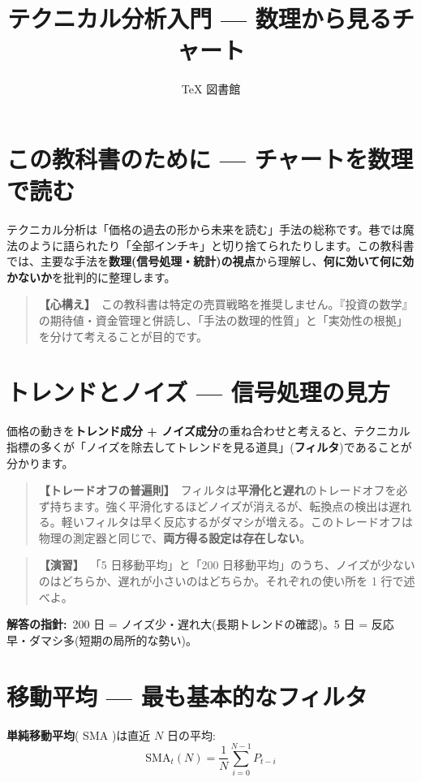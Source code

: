 \documentclass{article}
\title{テクニカル分析入門 — 数理から見るチャート}
\author{TeX 図書館}
\begin{document}
\section{この教科書のために — チャートを数理で読む}

テクニカル分析は「価格の過去の形から未来を読む」手法の総称です。巷では魔法のように語られたり「全部インチキ」と切り捨てられたりします。この教科書では、主要な手法を\textbf{数理(信号処理・統計)の視点}から理解し、\textbf{何に効いて何に効かないか}を批判的に整理します。

\begin{quote}
\textbf{【心構え】}\ この教科書は特定の売買戦略を推奨しません。『投資の数学』の期待値・資金管理と併読し、「手法の数理的性質」と「実効性の根拠」を分けて考えることが目的です。
\end{quote}

\section{トレンドとノイズ — 信号処理の見方}

価格の動きを\textbf{トレンド成分 + ノイズ成分}の重ね合わせと考えると、テクニカル指標の多くが「ノイズを除去してトレンドを見る道具」(\textbf{フィルタ})であることが分かります。

\begin{quote}
\textbf{【トレードオフの普遍則】}\ フィルタは\textbf{平滑化と遅れ}のトレードオフを必ず持ちます。強く平滑化するほどノイズが消えるが、転換点の検出は遅れる。軽いフィルタは早く反応するがダマシが増える。このトレードオフは物理の測定器と同じで、\textbf{両方得る設定は存在しない}。
\end{quote}

\begin{quote}
\textbf{【演習】}\ 「5 日移動平均」と「200 日移動平均」のうち、ノイズが少ないのはどちらか、遅れが小さいのはどちらか。それぞれの使い所を 1 行で述べよ。
\end{quote}

\textbf{解答の指針:}\ 200 日 = ノイズ少・遅れ大(長期トレンドの確認)。5 日 = 反応早・ダマシ多(短期の局所的な勢い)。

\section{移動平均 — 最も基本的なフィルタ}

\textbf{単純移動平均}( SMA )は直近 \(N\) 日の平均:
\[ \mathrm{SMA}_t(N) = \frac{1}{N}\sum_{i=0}^{N-1} P_{t-i} \]
\end{document}
